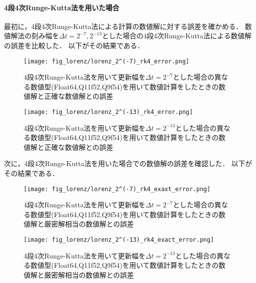 \paragraph*{4段4次Runge-Kutta法を用いた場合}
最初に，4段4次Runge-Kutta法による計算の数値解に対する誤差を確かめる．
数値解法の刻み幅を$\Delta t = 2^{-7},2^{-13}$とした場合の4段4次Runge-Kutta法による数値解の誤差を比較した．
以下がその結果である．
\begin{figure}[H]
    \centering
    \begin{minipage}[b]{0.49\columnwidth}
        \centering
        \texttt{[image: fig\_lorenz/lorenz\_2^(-7)\_rk4\_error.png]}
        \caption{4段4次Runge-Kutta法を用いて更新幅を$\Delta t = 2^{-7}$とした場合の異なる数値型(Float64,Q11f52,Q9f54)を用いて数値計算をしたときの数値解と正確な数値解との誤差}
        \label{fig:lorenz_2^(-7)_rk4_error}
    \end{minipage}
    \begin{minipage}[b]{0.49\columnwidth}
        \centering
        \texttt{[image: fig\_lorenz/lorenz\_2^(-13)\_rk4\_error.png]}
        \caption{4段4次Runge-Kutta法を用いて更新幅を$\Delta t =  2^{-13}$とした場合の異なる数値型(Float64,Q11f52,Q9f54)を用いて数値計算をしたときの数値解と正確な数値解との誤差}
        \label{fig:lorenz_2^(-13)_rk4_error}
    \end{minipage}
\end{figure}
次に，4段4次Runge-Kutta法を用いた場合での数値解の誤差を確認した．
以下がその結果である．
\begin{figure}[H]
    \centering
    \begin{minipage}[b]{0.49\columnwidth}
        \centering
        \texttt{[image: fig\_lorenz/lorenz\_2^(-7)\_rk4\_exaxt\_error.png]}
        \caption{4段4次Runge-Kutta法を用いて更新幅を$\Delta t = 2^{-7}$とした場合の異なる数値型(Float64,Q11f52,Q9f54)を用いて数値計算をしたときの数値解と厳密解相当の数値解との誤差}
        \label{fig:lorenz_2^(-7)_rk4_exact_error}
    \end{minipage}
    \begin{minipage}[b]{0.49\columnwidth}
        \centering
        \texttt{[image: fig\_lorenz/lorenz\_2^(-13)\_rk4\_exact\_error.png]}
        \caption{4段4次Runge-Kutta法を用いて更新幅を$\Delta t =  2^{-13}$とした場合の異なる数値型(Float64,Q11f52,Q9f54)を用いて数値計算をしたときの数値解と厳密解相当の数値解との誤差}
        \label{fig:lorenz_2^(-13)_rk4_exact_error}
    \end{minipage}
\end{figure}

